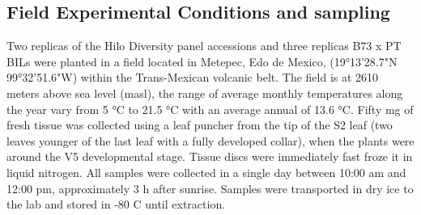 \documentclass[9pt,twocolumn,twoside]{BioRxiv}
\begin{document}
\subsection{Field Experimental Conditions and sampling} 
Two replicas of the Hilo Diversity panel accessions and three replicas B73 x PT BILs were planted in a field located in Metepec, Edo de Mexico, (19°13'28.7"N 99°32'51.6"W) within the Trans-Mexican volcanic belt. 
The field is at 2610 meters above sea level (masl), the range of average monthly temperatures along the year vary from 5 °C to 21.5 °C with an average annual of 13.6 °C.  
Fifty mg of fresh tissue was collected using a leaf puncher from the tip of the S2 leaf (two leaves younger of the last leaf with a fully developed collar), when the plants were around the V5 developmental stage. 
Tissue discs were immediately fast froze it in liquid nitrogen. All samples were collected in a single day between 10:00 am and 12:00 pm, approximately 3 h after sunrise. 
Samples were transported in dry ice to the lab and stored in -80 C until extraction. 
\end{document}
